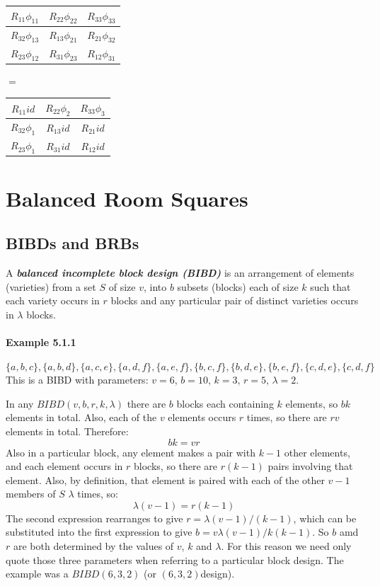 \documentclass[
  12pt,
  a4paper]{book}
\begin{document}
\begin{longtable}[]{@{}ccc@{}}
\toprule
\(R_{11}\phi _{11}\) & \(R_{22}\phi _{22}\) &
\(R_{33}\phi _{33}\)\tabularnewline
\midrule
\endhead
\(R_{32}\phi _{13}\) & \(R_{13}\phi _{21}\) &
\(R_{21}\phi _{32}\)\tabularnewline
\(R_{23}\phi _{12}\) & \(R_{31}\phi _{23}\) &
\(R_{12}\phi _{31}\)\tabularnewline
\bottomrule
\end{longtable}

\(=\)

\begin{longtable}[]{@{}ccc@{}}
\toprule
\(R_{11}id\) & \(R_{22}\phi _{2}\) & \(R_{33}\phi _{3}\)\tabularnewline
\midrule
\endhead
\(R_{32}\phi _{1}\) & \(R_{13}id\) & \(R_{21}id\)\tabularnewline
\(R_{23}\phi _{1}\) & \(R_{31}id\) & \(R_{12}id\)\tabularnewline
\bottomrule
\end{longtable}

\hypertarget{balanced-room-squares}{%
\chapter{Balanced Room Squares}\label{balanced-room-squares}}

\hypertarget{bibds-and-brbs}{%
\section{BIBDs and BRBs}\label{bibds-and-brbs}}

A \textbf{\emph{balanced incomplete block design (BIBD)}} is an
arrangement of elements (varieties) from a set \(S\) of size \(v\), into
\(b\) subsets (blocks) each of size \(k\) such that each variety occurs
in \(r\) blocks and any particular pair of distinct varieties occurs in
\(\lambda\) blocks.

\hypertarget{example-5.1.1}{%
\subsubsection{Example 5.1.1}\label{example-5.1.1}}

\[\{a,b,c\},\{a,b,d\},\{a,c,e\},\{a,d,f\},\{a,e,f\},\{b,c,f\},\{b,d,e\},\{b,e,f\},\{c,d,e\},\{c,d,f\}\]
This is a BIBD with parameters: \(v = 6\), \(b = 10\), \(k = 3\),
\(r = 5\), \(\lambda = 2\).

In any \(BIBD(v, b, r, k, \lambda)\) there are \(b\) blocks each
containing \(k\) elements, so \(bk\) elements in total. Also, each of
the \(v\) elements occurs \(r\) times, so there are \(rv\) elements in
total. Therefore: \[bk = vr\] Also in a particular block, any element
makes a pair with \(k - 1\) other elements, and each element occurs in
\(r\) blocks, so there are \(r(k - 1)\) pairs involving that element.
Also, by definition, that element is paired with each of the other
\(v - 1\) members of \(S\) \(\lambda\) times, so:
\[\lambda (v - 1) = r(k - 1)\] The second expression rearranges to give
\(r = \lambda (v - 1)/(k - 1)\), which can be substituted into the first
expression to give \(b=v\lambda (v - 1)/k(k - 1)\). So \(b\) amd \(r\)
are both determined by the values of \(v\), \(k\) and \(\lambda\). For
this reason we need only quote those three parameters when referring to
a particular block design. The example was a \(BIBD(6, 3, 2)\) (or
\((6, 3, 2)\)design).
\end{document}

